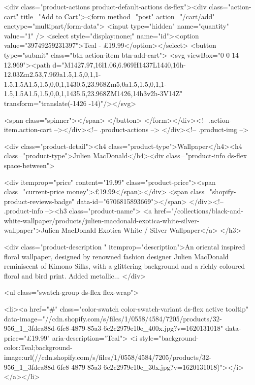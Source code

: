{{{{{{{<div class="product-actions product-default-actions ds-flex"><div class="action-cart" title="Add to Cart"><form method="post" action="/cart/add" enctype="multipart/form-data">
            <input type="hidden" name="quantity" value="1" />
            <select style="display:none;" name="id"><option value="39749259231397">Teal - £19.99</option></select>
            <button type="submit" class="btn action-item btn-add-cart">
              <svg viewBox="0 0 14 12.969"><path d="M1427.97,16l1.06,6.969H1437L1440,16h-12.03Zm2.53,7.969a1.5,1.5,0,1,1-1.5,1.5A1.5,1.5,0,0,1,1430.5,23.968Zm5,0a1.5,1.5,0,1,1-1.5,1.5A1.5,1.5,0,0,1,1435.5,23.968ZM1426,14h3v2h-3V14Z" transform="translate(-1426 -14)"/></svg>

              <span class="spinner"></span>
            </button>
          </form></div><!-- .action-item.action-cart --></div><!-- .product-actions -->
</div><!-- .product-img -->

<div class="product-detail"><h4 class="product-type">Wallpaper</h4><h4 class="product-type">Julien MacDonald</h4><div class="product-info ds-flex space-between">
    
<div itemprop="price" content="19.99" class="product-price"><span class="current-price money">£19.99</span></div>
    <span class="shopify-product-reviews-badge" data-id="6706815893669"></span>
  </div><!-- .product-info --><h3 class="product-name">
      <a href="/collections/black-and-white-wallpaper/products/julien-macdonald-exotica-white-silver-wallpaper">Julien MacDonald Exotica White / Silver Wallpaper</a>
    </h3>
    
<div class="product-description " itemprop="description">An oriental inspired floral wallpaper, designed by renowned fashion designer Julien MacDonald reminiscent of Kimono Silks, with a glittering background and a richly coloured floral and bird print. Added metallic...
</div>



<ul class="swatch-group ds-flex flex-wrap">
        
<li><a href="#" class="color-swatch color-swatch-variant ds-flex active tooltip" data-image="//cdn.shopify.com/s/files/1/0558/4584/7205/products/32-956_1_3fdea88d-6fc8-4879-85a3-6c2c2979e10e_400x.jpg?v=1620131018" data-price="£19.99" aria-description="Teal">
              <i style="background-color:Teal;background-image:url(//cdn.shopify.com/s/files/1/0558/4584/7205/products/32-956_1_3fdea88d-6fc8-4879-85a3-6c2c2979e10e_30x.jpg?v=1620131018)"></i>
            </a></li>

}}}}}}}
